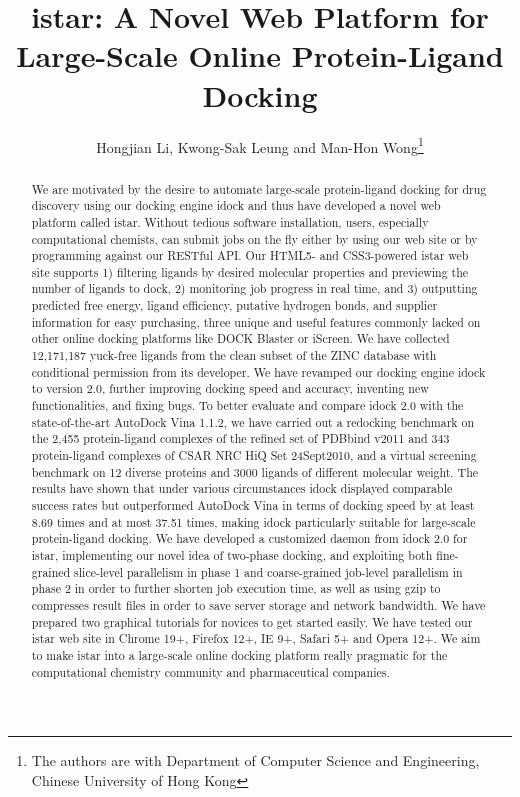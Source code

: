 \documentclass[12pt]{article}
\title{istar: A Novel Web Platform for Large-Scale Online Protein-Ligand Docking}
\author{Hongjian Li, Kwong-Sak Leung and Man-Hon Wong\thanks{The authors are with Department of Computer Science and Engineering, Chinese University of Hong Kong}}
\begin{document}
\maketitle

\begin{abstract}
We are motivated by the desire to automate large-scale protein-ligand docking for drug discovery using our docking engine idock and thus have developed a novel web platform called istar. Without tedious software installation, users, especially computational chemists, can submit jobs on the fly either by using our web site or by programming against our RESTful API. Our HTML5- and CSS3-powered istar web site supports 1) filtering ligands by desired molecular properties and previewing the number of ligands to dock, 2) monitoring job progress in real time, and 3) outputting predicted free energy, ligand efficiency, putative hydrogen bonds, and supplier information for easy purchasing, three unique and useful features commonly lacked on other online docking platforms like DOCK Blaster or iScreen. We have collected 12,171,187 yuck-free ligands from the clean subset of the ZINC database with conditional permission from its developer. We have revamped our docking engine idock to version 2.0, further improving docking speed and accuracy, inventing new functionalities, and fixing bugs. To better evaluate and compare idock 2.0 with the state-of-the-art AutoDock Vina 1.1.2, we have carried out a redocking benchmark on the 2,455 protein-ligand complexes of the refined set of PDBbind v2011 and 343 protein-ligand complexes of CSAR NRC HiQ Set 24Sept2010, and a virtual screening benchmark on 12 diverse proteins and 3000 ligands of different molecular weight. The results have shown that under various circumstances idock displayed comparable success rates but outperformed AutoDock Vina in terms of docking speed by at least 8.69 times and at most 37.51 times, making idock particularly suitable for large-scale protein-ligand docking. We have developed a customized daemon from idock 2.0 for istar, implementing our novel idea of two-phase docking, and exploiting both fine-grained slice-level parallelism in phase 1 and coarse-grained job-level parallelism in phase 2 in order to further shorten job execution time, as well as using gzip to compresses result files in order to save server storage and network bandwidth. We have prepared two graphical tutorials for novices to get started easily. We have tested our istar web site in Chrome 19+, Firefox 12+, IE 9+, Safari 5+ and Opera 12+. We aim to make istar into a large-scale online docking platform really pragmatic for the computational chemistry community and pharmaceutical companies.
\end{abstract}
\end{document}
